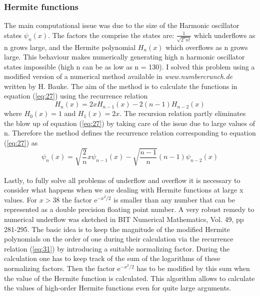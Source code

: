 \documentclass[10pt, a4paper, singlespacing, headsepline]{report}
\begin{document}
\subsubsection{Hermite functions}\label{Hermite functions}
The main computational issue was due to the size of the Harmonic oscillator states $\psi_n(x)$. The factors the comprise the states are: $\frac{1}{\sqrt{2^n n!}}$ which underflows as n grows large, and the Hermite polynomial $H_n(x)$ which overflows as n grows large. This behaviour makes numerically generating high n harmonic oscillator states impossible (high n can be as low as n = 130).
I solved this problem using a modified version of a numerical method available in \emph{www.numbercrunch.de} written by H. Bauke. The aim of the method is to calculate the functions in equation (\ref{eq:27}) using the recurrence relation 
\begin{equation} \label{eq:30}
H_n(x) = 2xH_{n-1}(x) - 2(n-1)H_{n-2}(x)
\end{equation}
where $H_0(x) = 1 $ and $H_1(x) = 2x$. The recursion relation partly eliminates the blow up of equation (\ref{eq:27}) by taking care of the issue due to large values of n. Therefore the method defines the recurrence relation corresponding to equation (\ref{eq:27}) as 
\begin{equation} \label{eq:31}
\psi_n(x) = \sqrt{\frac{2}{n}}x\psi_{n-1}(x) - \sqrt{\frac{n-1}{n}}(n-1)\psi_{n-2}(x)
\end{equation}
\\Lastly, to fully solve all problems of underflow and overflow it is necessary to consider what happens when we are dealing with Hermite functions at large x values.
For $x>38$ the factor $\mathrm{e}^{-x^2/2}$ is smaller than any number that can be represented as a double precision floating point number. A very robust remedy to numerical underflow was sketched in BIT Numerical Mathematics, Vol. 49, pp 281-295. The basic idea is to keep the magnitude of the modified Hermite polynomials on the order of one during their calculation via the recurrence relation (\ref{eq:31}) by introducing a suitable normalizing factor. During the calculation one has to keep track of the sum of the logarithms of these normalizing factors. Then the factor $\mathrm{e}^{-x^2/2}$ has to be modified by this sum when the value of the Hermite function is calculated. This algorithm allows to calculate the values of high-order Hermite functions even for quite large arguments\cite{Bauke}.\\
\end{document}
